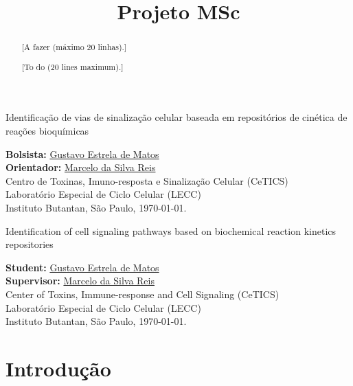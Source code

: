 \documentclass[12pt]{article}
\title{Projeto MSc}
\begin{document}
%
\doublespacing

\thispagestyle{empty} 
\begin{flushright}
    {\LARGE Identificação de vias de sinalização celular baseada em repositórios de cinética de reações bioquímicas}

  \bigskip
  \bigskip
        
  {\large {\bf Bolsista:} \href{mailto:gustavo.estrela.matos@usp.br}{Gustavo Estrela de Matos}\\ 
  {\bf Orientador:} \href{mailto:marcelo.reis@butantan.gov.br}{Marcelo da Silva Reis}\\
  \bigskip
Centro de Toxinas, Imuno-resposta e Sinalização Celular (CeTICS)\\
Laboratório Especial de Ciclo Celular (LECC)\\
  Instituto Butantan, São Paulo, \today.\\
  }

  \bigskip
  \bigskip
\end{flushright}
\begin{abstract}
{\color{blue}[A fazer (máximo 20 linhas).]}
\end{abstract}

\newpage
\thispagestyle{empty} 
\begin{flushright}
    {\LARGE Identification of cell signaling pathways based on biochemical reaction kinetics repositories}

  \bigskip
  \bigskip
        
  {\large {\bf Student:} \href{mailto:gustavo.estrela.matos@usp.br}{Gustavo Estrela de Matos}\\ 
  {\bf Supervisor:} \href{mailto:marcelo.reis@butantan.gov.br}{Marcelo da Silva Reis}\\
  \bigskip
Center of Toxins, Immune-response and Cell Signaling (CeTICS)\\
Laboratório Especial de Ciclo Celular (LECC)\\
  Instituto Butantan, São Paulo, \today.\\
  }
  \bigskip
  \bigskip
\end{flushright}
\begin{abstract}
{\color{blue}[To do (20 lines maximum).]}
\end{abstract}

\newpage
{}
\tableofcontents
\newpage

\section{Introdução}
\end{document}
